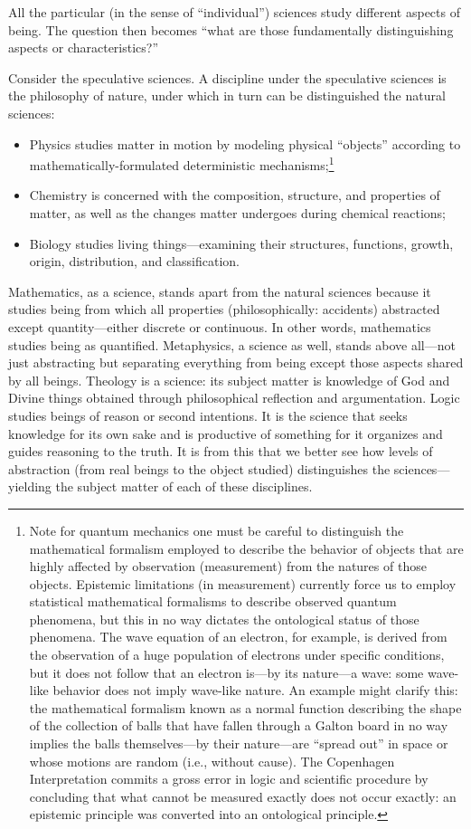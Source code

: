 All the particular (in the sense of ``individual'') sciences study different aspects of being. The question then becomes ``what are those fundamentally distinguishing aspects or characteristics?''

Consider the speculative sciences. A discipline under the speculative sciences is the philosophy of nature, under which in turn can be distinguished the natural sciences:

\begin{itemize}
\item Physics studies matter in motion by modeling physical ``objects'' according to mathematically-formulated deterministic mechanisms;\footnote{Note for quantum mechanics one must be careful to distinguish the mathematical formalism employed to describe the behavior of objects that are highly affected by observation (measurement) from the natures of those objects. Epistemic limitations (in measurement) currently force us to employ statistical mathematical formalisms to describe observed quantum phenomena, but this in no way dictates the ontological status of those phenomena. The wave equation of an electron, for example, is derived from the observation of a huge population of electrons under specific conditions, but it does not follow that an electron is---by its nature---a wave: some wave-like behavior does not imply wave-like nature. An example might clarify this: the mathematical formalism known as a normal function describing the shape of the collection of balls that have fallen through a Galton board in no way implies the balls themselves---by their nature---are ``spread out'' in space or whose motions are random (i.e., without cause). The Copenhagen Interpretation commits a gross error in logic and scientific procedure by concluding that what cannot be measured exactly does not occur exactly: an epistemic principle was converted into an ontological principle.}
\item Chemistry is concerned with the composition, structure, and properties of matter, as well as the changes matter undergoes during chemical reactions;
\item Biology studies living things---examining their structures, functions, growth, origin, distribution, and classification.
\end{itemize}

Mathematics, as a science, stands apart from the natural sciences because it studies being from which all properties (philosophically: accidents) abstracted except quantity---either discrete or continuous. In other words, mathematics studies being as quantified. Metaphysics, a science as well, stands above all---not just abstracting but separating everything from being except those aspects shared by all beings. Theology is a science: its subject matter is knowledge of God and Divine things obtained through philosophical reflection and argumentation. Logic studies beings of reason or second intentions. It is the science that seeks knowledge for its own sake and is productive of something for it organizes and guides reasoning to the truth. It is from this that we better see how levels of abstraction (from real beings to the object studied) distinguishes the sciences---yielding the subject matter of each of these disciplines.


